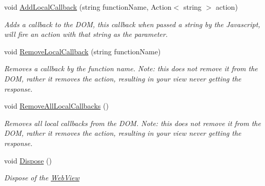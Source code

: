 \begin{DoxyCompactItemize}
void \hyperlink{class_xam_1_1_plugin_1_1_web_view_1_1_abstractions_1_1_forms_web_view_a5b1fa9ce47383a6d375eab084e546f8e}{Add\+Local\+Callback} (string function\+Name, Action$<$ string $>$ action)
\begin{DoxyCompactList}\small\item\em Adds a callback to the D\+OM, this callback when passed a string by the Javascript, will fire an action with that string as the parameter. \end{DoxyCompactList}\item 
void \hyperlink{class_xam_1_1_plugin_1_1_web_view_1_1_abstractions_1_1_forms_web_view_a1335848a5cd8da3b36dd8e49fe31094d}{Remove\+Local\+Callback} (string function\+Name)
\begin{DoxyCompactList}\small\item\em Removes a callback by the function name. Note\+: this does not remove it from the D\+OM, rather it removes the action, resulting in your view never getting the response. \end{DoxyCompactList}\item 
void \hyperlink{class_xam_1_1_plugin_1_1_web_view_1_1_abstractions_1_1_forms_web_view_a322caae404bbd0c8ae7ab3d00b9ccdd0}{Remove\+All\+Local\+Callbacks} ()
\begin{DoxyCompactList}\small\item\em Removes all local callbacks from the D\+OM. Note\+: this does not remove it from the D\+OM, rather it removes the action, resulting in your view never getting the response. \end{DoxyCompactList}\item 
void \hyperlink{class_xam_1_1_plugin_1_1_web_view_1_1_abstractions_1_1_forms_web_view_afc44efe2ad01ff5d59d6988a3c4f0099}{Dispose} ()
\begin{DoxyCompactList}\small\item\em Dispose of the \hyperlink{namespace_xam_1_1_plugin_1_1_web_view}{Web\+View} \end{DoxyCompactList}\end{DoxyCompactItemize}
